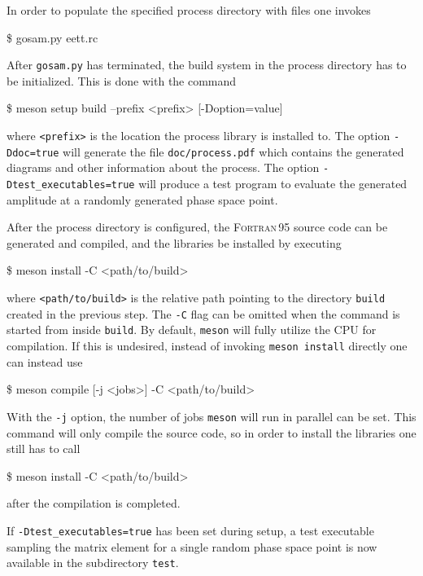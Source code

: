\documentclass[11pt,a4paper]{refrep}
\newcommand{\fortranXC}{\textsc{Fortran\,95}\xspace}
\begin{document}
In order to populate the specified process directory with files
one invokes
\begin{example}
\$ gosam.py eett.rc
\end{example}
After \texttt{gosam{.}py} has terminated, the build system in the process directory has to be initialized. This is done with the command
\begin{example}
\$ meson setup build --prefix <prefix> [-Doption=value]
\end{example}
where \texttt{<prefix>} is the location the process library is installed to. The option \texttt{-Ddoc=true} will generate the file \texttt{doc/process.pdf} which contains the generated diagrams and other information about the process. The option \texttt{-Dtest\_executables=true} will produce a test program to evaluate the generated amplitude at a randomly generated phase space point.

After the process directory is configured, the \fortranXC source code can be generated and compiled, and the libraries be installed by executing
\begin{example}
\$ meson install -C <path/to/build>
\end{example}
where \texttt{<path/to/build>} is the relative path pointing to the directory \texttt{build} created in the previous step. The \texttt{-C} flag can be omitted when the command is started from inside \texttt{build}. By default, \texttt{meson} will fully utilize the CPU for compilation. If this is undesired, instead of invoking \texttt{meson install} directly one can instead use
\begin{example}
\$ meson compile [-j <jobs>] -C <path/to/build>
\end{example}
 With the \texttt{-j} option, the number of jobs \texttt{meson} will run in parallel can be set. This command will only compile the source code, so in order to install the libraries one still has to call
 \begin{example}
\$ meson install -C <path/to/build>
\end{example}
after the compilation is completed.

If \texttt{-Dtest\_executables=true} has been set during setup, a test executable sampling the matrix element for a single random phase space point is now available in the subdirectory \texttt{test}.
\end{document}
